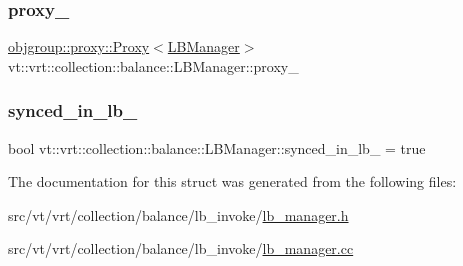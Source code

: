 \subsubsection{\texorpdfstring{proxy\+\_\+}{proxy\_}}
{\footnotesize\ttfamily \hyperlink{structvt_1_1objgroup_1_1proxy_1_1_proxy}{objgroup\+::proxy\+::\+Proxy}$<$\hyperlink{structvt_1_1vrt_1_1collection_1_1balance_1_1_l_b_manager}{L\+B\+Manager}$>$ vt\+::vrt\+::collection\+::balance\+::\+L\+B\+Manager\+::proxy\+\_\+\hspace{0.3cm}{\ttfamily [private]}}

\mbox{\label{structvt_1_1vrt_1_1collection_1_1balance_1_1_l_b_manager_aa47677efcfd106dbd8ab387b1a8e0c21}} 
\subsubsection{\texorpdfstring{synced\+\_\+in\+\_\+lb\+\_\+}{synced\_in\_lb\_}}
{\footnotesize\ttfamily bool vt\+::vrt\+::collection\+::balance\+::\+L\+B\+Manager\+::synced\+\_\+in\+\_\+lb\+\_\+ = true\hspace{0.3cm}{\ttfamily [private]}}



The documentation for this struct was generated from the following files\+:\begin{DoxyCompactItemize}
\item 
src/vt/vrt/collection/balance/lb\+\_\+invoke/\hyperlink{lb__manager_8h}{lb\+\_\+manager.\+h}\item 
src/vt/vrt/collection/balance/lb\+\_\+invoke/\hyperlink{lb__manager_8cc}{lb\+\_\+manager.\+cc}\end{DoxyCompactItemize}
